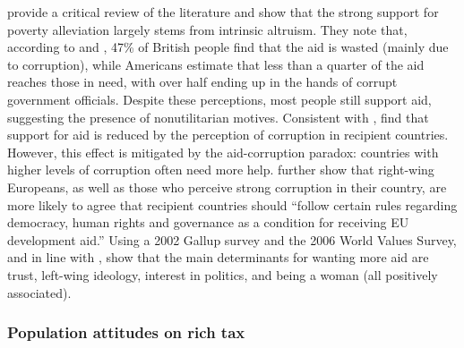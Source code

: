 \documentclass[12pt,english]{article}
\begin{document}
\citet{hudson_mile_2012} provide a critical review of the literature and show that the strong support for poverty alleviation largely stems from intrinsic altruism. They note that, according to \citet{dfid_aid_2009} and \citet{pipa_americans_2001}, 47\% of British people find that the aid is wasted (mainly due to corruption), while Americans estimate that less than a quarter of the aid reaches those in need, with over half ending up in the hands of corrupt government officials. Despite these perceptions, most people still support aid, suggesting the presence of nonutilitarian motives. Consistent with \citet{henson_public_2010}, \citet{bauhr_does_2013} find that support for aid is reduced by the perception of corruption in recipient countries. However, this effect is mitigated by the aid-corruption paradox: countries with higher levels of corruption often need more help. %
\citet{bodenstein_who_2017} further show that right-wing Europeans, as well as those who perceive strong corruption in their country, are more likely to agree that recipient countries should ``follow certain rules regarding democracy, human rights and governance as a condition for receiving EU development aid.'' 
Using a 2002 Gallup survey and the 2006 World Values Survey, and in line with \citet{bayram_aiding_2017}, \citet{paxton_individual_2012} show that the main determinants for wanting more aid are trust, left-wing ideology, interest in politics, and being a woman (all positively associated).  %


\subsubsection{Population attitudes on rich tax}\label{subsubsec:literature_wealth_tax}
\end{document}
